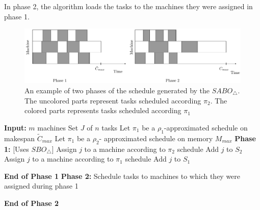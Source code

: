                   In phase 2, the algorithm loads the tasks to the machines they were assigned in phase 1.\\
                  
                    \begin{figure}[htp]
                    \centering
                    \includegraphics[width= 16 cm]{mem2.pdf}
                    \caption{An example of two phases of the schedule generated by the $SABO_\triangle$. The uncolored parts  represent tasks scheduled according $\pi_2$. The colored parts represents tasks scheduled according $\pi_1$}
                    \label{fig:ch5-1}
                    \end{figure} 
                      \begin{algorithm}                    
                      \caption{$SABO_\triangle$}
                      \label{alg2}
                       \begin{algorithmic} 
                       \State \textbf{Input:} $m$ machines 
                       \State \hspace*{42pt}Set $J$ of $n$ tasks
                       \State\hspace*{42pt}Let $\pi_1$ be a $ \rho_1$-approximated schedule on makespan $\tilde{C}_{max}$ 
                      \State \hspace*{42pt}Let $\pi_1$ be a $\rho_2$- approximated schedule on memory ${M_{max}}$
                      \State
                       \State \textbf{Phase 1:} [Uses $SBO_\triangle$]
                    \State Assign $j$ to a machine according to $\pi_2$ schedule
                    \State Add $j$ to $S_2$
                    \Else
                    \State Assign $j$ to a machine according to $\pi_1$ schedule
                    \State Add $j$ to $S_1$   
                    \EndIf 
                    \EndFor
                   
                     \State \textbf{End of Phase 1} 
                     \State 
                      \State \textbf{Phase 2:} 
                      \State \hspace*{42pt}Schedule tasks to machines to which they were assigned during phase 1
                         
                      \State \textbf{End of Phase 2} 
                       
                            \end{algorithmic}
                            \end{algorithm}     
        
